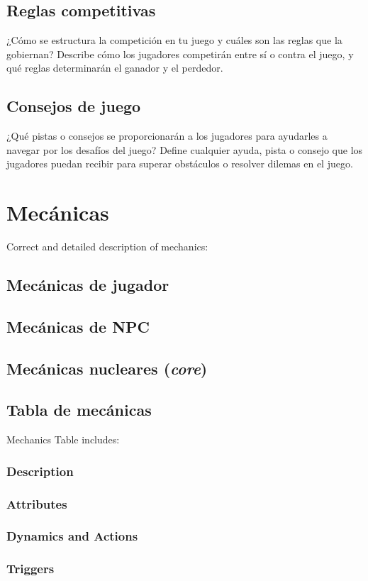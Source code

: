     \subsection{Reglas competitivas}
    ¿Cómo se estructura la competición en tu juego y cuáles son las reglas que la gobiernan?
    Describe cómo los jugadores competirán entre sí o contra el juego, y qué reglas determinarán el ganador y el perdedor.

    \subsection{Consejos de juego}
    ¿Qué pistas o consejos se proporcionarán a los jugadores para ayudarles a navegar por los desafíos del juego?
    Define cualquier ayuda, pista o consejo que los jugadores puedan recibir para superar obstáculos o resolver dilemas en el juego.


\section{Mecánicas}
Correct and detailed description of mechanics:
    \subsection{Mecánicas de jugador}
    \subsection{Mecánicas de NPC}
    \subsection{Mecánicas nucleares (\textit{core})}
    \subsection{Tabla de mecánicas}
    Mechanics Table includes:
        \subsubsection{Description}
        \subsubsection{Attributes}
        \subsubsection{Dynamics and Actions}
        \subsubsection{Triggers}
